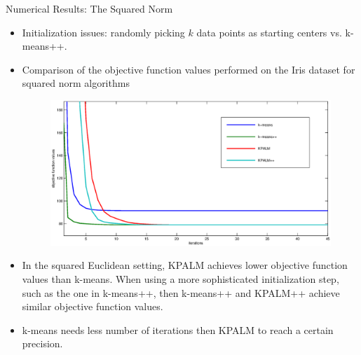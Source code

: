 \documentclass[9pt,handout]{beamer} %
\begin{document}
	\begin{frame}{Numerical Results: The Squared Norm}
		\begin{itemize}[<+->]
            \item Initialization issues: randomly picking $k$ data points as starting centers vs. k-means++.
        
        	\item Comparison of the objective function values performed on the Iris dataset for squared norm algorithms
		\begin{figure}
    		\centering
        	\includegraphics[width=0.75 \textwidth]{squared_norm_obj_comp}
		\end{figure}

	    	\item In the squared Euclidean setting, KPALM achieves lower objective function values than k-means. When using a more sophisticated initialization step, such as the one in k-means++, then k-means++ and KPALM++ achieve similar objective function values.
			\item k-means needs less number of iterations then KPALM to reach a certain precision.
		\end{itemize}
	\end{frame}	
	
\end{document}
